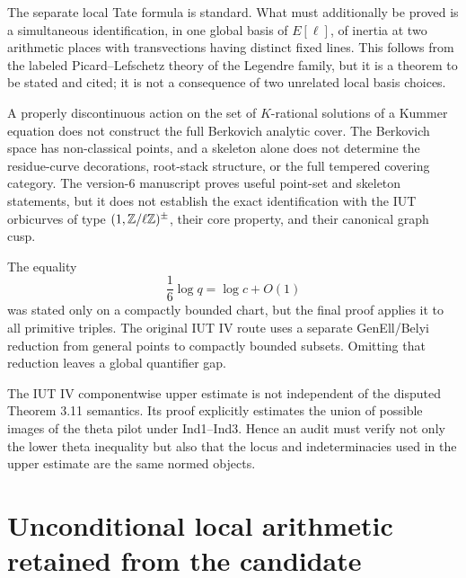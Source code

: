 \begin{audit}
The separate local Tate formula is standard.  What must additionally be proved is a simultaneous identification, in one global basis of $E[\ell]$, of inertia at two arithmetic places with transvections having distinct fixed lines.  This follows from the labeled Picard--Lefschetz theory of the Legendre family, but it is a theorem to be stated and cited; it is not a consequence of two unrelated local basis choices.
\end{audit}

\begin{audit}
A properly discontinuous action on the set of $K$-rational solutions of a Kummer equation does not construct the full Berkovich analytic cover.  The Berkovich space has non-classical points, and a skeleton alone does not determine the residue-curve decorations, root-stack structure, or the full tempered covering category.  The version-6 manuscript proves useful point-set and skeleton statements, but it does not establish the exact identification with the IUT orbicurves of type $(1,\mathbb Z/\ell\mathbb Z)^{\pm}$, their core property, and their canonical graph cusp.
\end{audit}

\begin{audit}
The equality
\[
 \frac16\log q=\log c+O(1)
\]
was stated only on a compactly bounded chart, but the final proof applies it to all primitive triples.  The original IUT IV route uses a separate GenEll/Belyi reduction from general points to compactly bounded subsets.  Omitting that reduction leaves a global quantifier gap.
\end{audit}

\begin{audit}
The IUT IV componentwise upper estimate is not independent of the disputed Theorem 3.11 semantics.  Its proof explicitly estimates the union of possible images of the theta pilot under Ind1--Ind3.  Hence an audit must verify not only the lower theta inequality but also that the locus and indeterminacies used in the upper estimate are the same normed objects.
\end{audit}

\section{Unconditional local arithmetic retained from the candidate}

